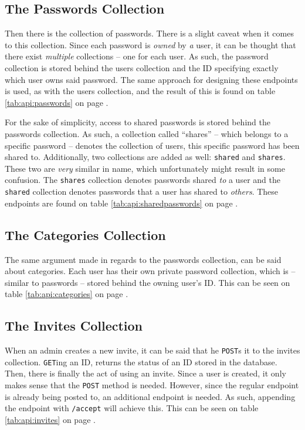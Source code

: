 		\subsection{The Passwords Collection}
			Then there is the collection of passwords. There is a slight caveat when it comes to this collection. Since each password is \emph{owned} by \emph{a} user, it can be thought that there exist \emph{multiple} collections -- one for each user. As such, the password collection is stored behind the users collection and the ID specifying exactly which user owns said password. The same approach for designing these endpoints is used, as with the users collection, and the result of this is found on table \ref{tab:api:passwords} on page \pageref{tab:api:passwords}.

			For the sake of simplicity, access to shared passwords is stored behind the passwords collection. As such, a collection called ``shares'' -- which belongs to a specific password -- denotes the collection of users, this specific password has been shared to. Additionally, two collections are added as well: \verb=shared= and \verb=shares=. These two are  \emph{very} similar in name, which unfortunately might result in some confusion. The \verb=shares= collection denotes passwords shared \emph{to} a user and the \verb=shared= collection denotes passwords that a user has shared to \emph{others}. These endpoints are found on table \ref{tab:api:sharedpasswords} on page \pageref{tab:api:sharedpasswords}.

		\subsection{The Categories Collection}
			The same argument made in regards to the passwords collection, can be said about categories. Each user has their own private password collection, which is -- similar to passwords -- stored behind the owning user's ID. This can be seen on table \ref{tab:api:categories} on page \pageref{tab:api:categories}.

		\subsection{The Invites Collection}
			When an admin creates a new invite, it can be said that he \verb=POST=s it to the invites collection. \verb=GET=ing an ID, returns the status of an ID stored in the database. Then, there is finally the act of using an invite. Since a user is created, it only makes sense that the \verb=POST= method is needed. However, since the regular endpoint is already being posted to, an additional endpoint is needed. As such, appending the endpoint with \verb=/accept= will achieve this. This can be seen on table \ref{tab:api:invites} on page \pageref{tab:api:invites}.

